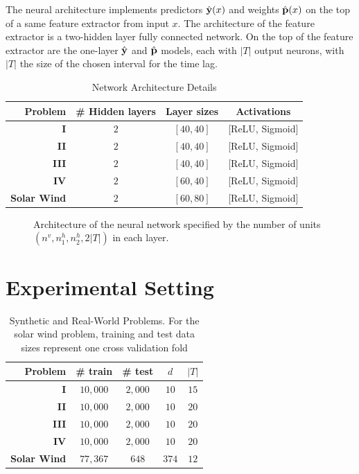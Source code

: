 The neural architecture implements predictors $\hat {\bf y}(x)$ and weights $\hat {\bf p}(x)$ on 
the top of a same feature extractor from input $x$. The architecture of the feature extractor is a 
two-hidden layer fully connected network. On the top of the feature extractor are the 
one-layer $\hat {\bf y}$ and $\hat {\bf p}$ models, each with $|T|$ output neurons, with $|T|$ the 
size of the chosen interval for the time lag.

\begin{table}[htbp]
  \caption{Network Architecture Details}\label{tab:arch_probs}
  \centering
  \begin{tabular}{ r c c c }
  \hline
  Problem &  \# Hidden layers & Layer sizes & Activations\\
  \hline
  \textbf{I} & $2$ & $[40, 40]$  & [ReLU, Sigmoid]\\
  \textbf{II} & $2$ & $[40, 40]$ & [ReLU, Sigmoid]\\
  \textbf{III} & $2$ & $[40, 40]$ & [ReLU, Sigmoid]\\
  \textbf{IV} & $2$ & $[60, 40]$ & [ReLU, Sigmoid]\\
  \textbf{Solar Wind} & $2$ & $[60, 80]$ & [ReLU, Sigmoid]\\
  \hline
  \end{tabular}
\end{table}


\begin{figure}[ht]
\centerline{\resizebox*{0.7\textwidth}{!}{}}
\caption{\label{fig:archi} Architecture of the neural network specified by the number of units 
$(n^v,n_1^h,n_2^h,2\vert T\vert)$ in each layer.}
\label{fig:NN}
\end{figure}

\section{Experimental Setting}\label{sec:pdtExp}

\begin{table}[ht]
  \caption{
    Synthetic and Real-World Problems. 
    For the solar wind problem, training and test data sizes represent one cross validation fold}
  \label{tab:exp_data_info}
  \centering
  \begin{tabular}{ r c c c c}
  \hline
  Problem &  \# train & \# test & $d$ & $|T|$ \\
  \hline
  \textbf{I} & $10,000$ & $2,000$  & $10$ & $15$\\
  \textbf{II} & $10,000$ & $2,000$ & $10$ & $20$\\
  \textbf{III} & $10,000$ & $2,000$ & $10$ & $20$\\
  \textbf{IV} & $10,000$ & $2,000$ & $10$ & $20$\\
  \textbf{Solar Wind} & $77,367$ & $648$ & $374$ & $12$\\
  \hline
  \end{tabular}
\end{table}

